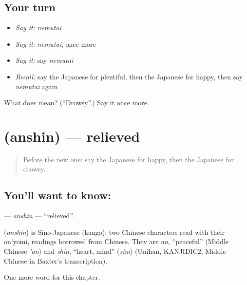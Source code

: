 \subsection*{Your turn}
\begin{itemize}
\raggedright
  \item \emph{Say it:} \emph{nemutai}
  \item \emph{Say it:} \emph{nemutai}, once more
  \item \emph{Say it:} say \emph{nemutai}
  \item \emph{Recall:} say the Japanese for plentiful, then the Japanese for happy, then say \emph{nemutai} again
\end{itemize}

\begin{tcolorbox}[breakable,colback=teal!4,colframe=teal!35!black,title={Before you move on}]
What does  mean? (\textquotedblleft{}Drowsy\textquotedblright{}.) Say it once more.
\end{tcolorbox}
\section[\texorpdfstring{\ja{あんしん} (anshin)}{あんしん (anshin)}]{ (anshin) — relieved}

\label{lesson:JA-C126-anshin}



\begin{quote}
Before the new one: say the Japanese for happy, then the Japanese for drowsy.
\end{quote}

\subsection*{You'll want to know: }
\textbf{} — \emph{anshin} — \textquotedblleft{}relieved\textquotedblright{}.

\begin{cousinweb}
\textbf{} (\emph{anshin}) is Sino-Japanese (kango): two Chinese characters read with their on'yomi, readings borrowed from Chinese. They are \emph{an}, \textquotedblleft{}peaceful\textquotedblright{} (Middle Chinese \emph{'an}) and \emph{shin}, \textquotedblleft{}heart, mind\textquotedblright{} (\emph{sim}) (Unihan, KANJIDIC2; Middle Chinese in Baxter's transcription).
\end{cousinweb}

\begin{grammarlens}[title={What you've built}]
One more word for this chapter.
\end{grammarlens}


